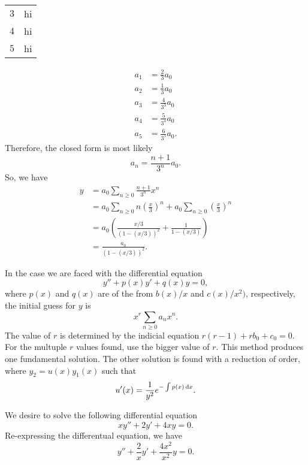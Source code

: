 \begin{soln}
\begin{center}
\begin{tabular}{| c | c |}
            $3$ & hi \\
            $4$ & hi \\
            $5$ & hi \\
            \hline
        \end{tabular}
    \end{center}
    \begin{align*}
        a_1 &= \frac{2}{3}a_0 \\
        a_2 &= \frac{1}{3}a_0 \\
        a_3 &= \frac{4}{3^3}a_0 \\
        a_4 &= \frac{5}{3^4}a_0 \\
        a_5 &= \frac{6}{3^5}a_0.
    \end{align*}
    Therefore, the closed form is most likely $$a_n = \frac{n+1}{3^n}a_0.$$ So,
    we have 
    \begin{align*}
        y &= a_0\sum_{n \geq 0} \frac{n+1}{3^n} x^n \\
        &= a_0 \sum_{n \geq 0} n \left(\frac{x}{3} \right)^n + a_0\sum_{n\geq 0} \left(\frac{x}{3}\right)^n \\
        &= a_0 \left(\frac{x/3}{(1-(x/3))^2}+\frac{1}{1-(x/3)} \right) \\
        &=\frac{a_0}{(1-(x/3))^2}.
    \end{align*}
\end{soln}
\begin{theorem}
    In the case we are faced with the differential equation
    $$y'' + p(x)y' + q(x)y = 0,$$ where $p(x)$ and $q(x)$ are of the
    from $b(x)/x$ and $c(x)/x^2)$, respectively, the initial guess for $y$
    is $$x^r \sum_{n \geq 0} a_n x^n.$$ The value of $r$ is determined by the
    indicial equation $r(r-1)+rb_0 + c_0 = 0$. For the multuple $r$ values
    found, use the bigger value of $r$. This method produces one fundamental
    solution. The other solution is found with a reduction of order, where
    $y_2=u(x)y_1(x)$ such that 
    $$u'(x) = \frac{1}{y^2}e^{-\int p(x) \dif x}.$$
\end{theorem}
\begin{example}
    We desire to solve the following differential equation
    $$xy''+2y'+4xy = 0.$$ Re-expressing the differentual equation, we have
    $$y'' + \frac{2}{x}y' + \frac{4x^2}{x^2}y = 0.$$
\end{example}

